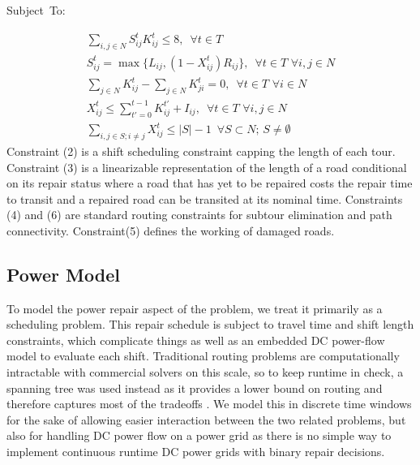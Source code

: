 \documentclass[10pt]{article}
\begin{document}
	
	\mbox{Subject To:}
	
	\begin{eqnarray}
	\sum_{i,j \in N} S_{ij}^t K_{ij}^t \leq 8, \hspace{6pt} \forall t\in T \\
	S_{ij}^t = \max \{L_{ij}, (1-X_{ij}^t)R_{ij} \}, \hspace{6pt} \forall t\in T \hspace{4pt} \forall i,j \in N\\
	\sum_{j \in N} K_{ij}^t - \sum_{j \in N} K_{ji}^t = 0, \hspace{6pt} \forall t\in T \hspace{4pt} \forall i \in N\\
	X_{ij}^t \le \sum_{t'=0}^{t-1} K_{ij}^{t'} + I_{ij}, \hspace{6pt} \forall t\in T \hspace{4pt} \forall i,j \in N\\
	\sum_{i,j \in S; i\neq j} X_{ij}^t \leq |S|-1 \hspace{6pt} \forall S \subset N; \hspace{2pt} S \neq \emptyset
	\end{eqnarray}
Constraint (2) is a shift scheduling constraint capping the length of each tour. Constraint (3) is a linearizable representation of the length of a road conditional on its repair status where a road that has yet to be repaired costs the repair time to transit and a repaired road can be transited at its nominal time. Constraints (4) and (6) are standard routing constraints for subtour elimination and path connectivity. Constraint(5) defines the working of damaged roads.


\subsection{Power Model}
\vspace*{-12pt}
To model the power repair aspect of the problem, we treat it primarily as a scheduling problem. This repair schedule is subject to travel time and shift length constraints, which complicate things as well as an embedded DC power-flow model to evaluate each shift. Traditional routing problems are computationally intractable with commercial solvers on this scale, so to keep runtime in check, a spanning tree was used instead as it provides a lower bound on routing and therefore captures most of the tradeoffs \cite{Held1971}. We model this in discrete time windows for the sake of allowing easier interaction between the two related problems, but also for handling DC power flow on a power grid as there is no simple way to implement continuous runtime DC power grids with binary repair decisions.
\end{document}
